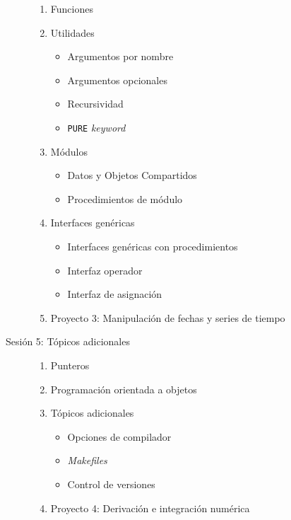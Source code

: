 \begin{description}
\begin{enumerate}
      \item Funciones

      \item Utilidades
        \begin{itemize}
          \item Argumentos por nombre
          \item Argumentos opcionales
          \item Recursividad
          \item \texttt{PURE} \textit{keyword}
        \end{itemize}

      \item Módulos
        \begin{itemize}
          \item Datos y Objetos Compartidos
          \item Procedimientos de módulo
        \end{itemize}

      \item Interfaces genéricas
        \begin{itemize}
          \item Interfaces genéricas con procedimientos
          \item Interfaz operador
          \item Interfaz de asignación
        \end{itemize}

      \item Proyecto 3: Manipulación de fechas y series de tiempo
    \end{enumerate}

  \item[Sesión 5: Tópicos adicionales] \hfill
    \begin{enumerate}
      \item Punteros
      \item Programación orientada a objetos
      \item Tópicos adicionales
      \begin{itemize}
        \item Opciones de compilador
        \item \textit{Makefiles}
        \item Control de versiones
      \end{itemize}
      \item Proyecto 4: Derivación e integración numérica
    \end{enumerate}
\end{description}
